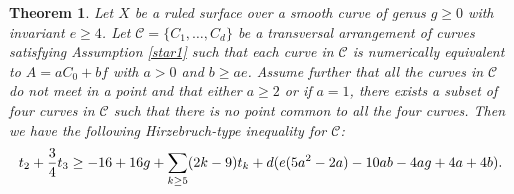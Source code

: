 \documentclass[12pt,reqno]{amsart}
\theoremstyle{plain}
\numberwithin{equation}{section}
\newtheorem{theorem}{Theorem}[section]
\theoremstyle{definition}
\begin{document}
	


	\begin{theorem}\cite[Equation 4.9]{HS} \label{HTIn}
		Let $X$ be a ruled surface over a smooth curve of genus $g \geq 0$ with invariant $e
		\ge 4$.  Let $\mathcal{C} = \{C_{1}, \ldots, C_{d}\}$ be a transversal arrangement of curves
		satisfying Assumption \ref{star1} such that each curve in
		$\mathcal{C}$ is numerically equivalent to $A=aC_0+bf$ with $a > 0$
		and $b \ge ae$. Assume further that all the curves in $\mathcal{C}$ do not meet in a point and that 
  either $a\geq 2$ or if $a=1$, there exists a subset of four curves in $\mathcal{C}$ such that there is no point common to all the four curves. Then we have the following Hirzebruch-type inequality for $\mathcal{C}$:\\
		\begin{equation*}\label{eq:Hirzebruch type ineq}
			t_{2}+\frac{3}{4}t_{3} \geq -16+16g+\sum_{k\geq5}(2k-9)t_{k}+
			d(e(5a^2-2a)-10ab-4ag+4a+4b).\\
		\end{equation*}	
	\end{theorem}
	
\end{document}
